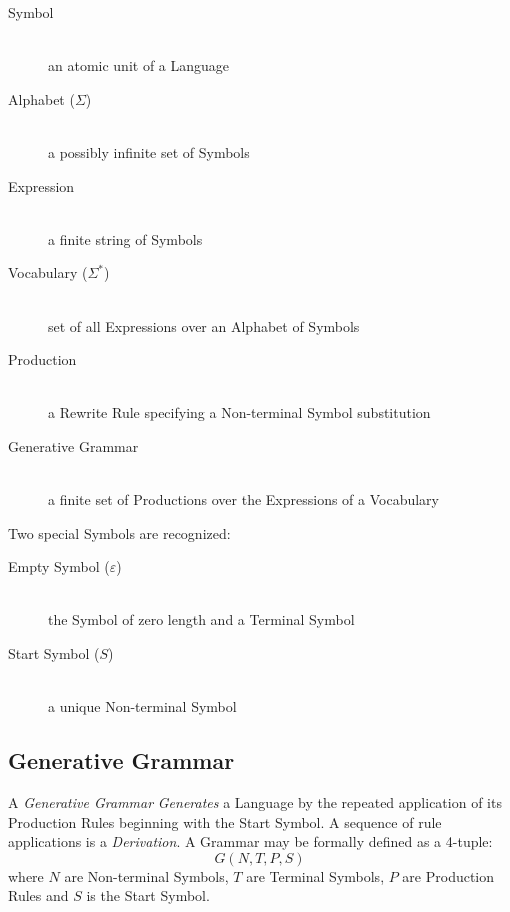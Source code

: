 \begin{description}

    \item[Symbol] \hfill \\
    an atomic unit of a Language

    \item[Alphabet ($\Sigma$)] \hfill \\
    a possibly infinite set of Symbols

    \item[Expression] \hfill \\
    a finite string of Symbols

    \item[Vocabulary ($\Sigma^{*}$)] \hfill \\
    set of all Expressions over an Alphabet of Symbols

    \item[Production] \hfill \\
    a Rewrite Rule specifying a Non-terminal Symbol substitution

    \item[Generative Grammar] \hfill \\
    a finite set of Productions over the Expressions of a Vocabulary

\end{description}
Two special Symbols are recognized:
\begin{description}

    \item[Empty Symbol ($\varepsilon$)] \hfill \\
    the Symbol of zero length and a Terminal Symbol

    \item[Start Symbol ($S$)] \hfill \\
    a unique Non-terminal Symbol

\end{description}



\subsection{Generative Grammar}\label{sec:generative_grammar}

A \emph{Generative Grammar} \emph{Generates} a Language by the
repeated application of its Production Rules beginning with the Start
Symbol. A sequence of rule applications is a \emph{Derivation}. A
Grammar may be formally defined as a 4-tuple:
\[
    G(N,T,P,S)
\]
where $N$ are Non-terminal Symbols, $T$ are Terminal Symbols, $P$ are
Production Rules and $S$ is the Start Symbol.

